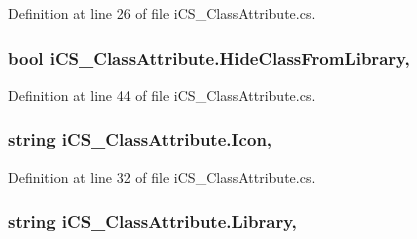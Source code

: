 Definition at line 26 of file i\+C\+S\+\_\+\+Class\+Attribute.\+cs.

\hypertarget{classi_c_s___class_attribute_ae1e20723a8288e0c57b185d021d1f80b}{
\subsubsection[{Hide\+Class\+From\+Library}]{\setlength{\rightskip}{0pt plus 5cm}bool i\+C\+S\+\_\+\+Class\+Attribute.\+Hide\+Class\+From\+Library\hspace{0.3cm}{\ttfamily [get]}, {\ttfamily [set]}}}\label{classi_c_s___class_attribute_ae1e20723a8288e0c57b185d021d1f80b}


Definition at line 44 of file i\+C\+S\+\_\+\+Class\+Attribute.\+cs.

\hypertarget{classi_c_s___class_attribute_aff8b54d19068adfdb7195164014074a5}{
\subsubsection[{Icon}]{\setlength{\rightskip}{0pt plus 5cm}string i\+C\+S\+\_\+\+Class\+Attribute.\+Icon\hspace{0.3cm}{\ttfamily [get]}, {\ttfamily [set]}}}\label{classi_c_s___class_attribute_aff8b54d19068adfdb7195164014074a5}


Definition at line 32 of file i\+C\+S\+\_\+\+Class\+Attribute.\+cs.

\hypertarget{classi_c_s___class_attribute_a776c64441f2fd2fd675db29185dc6000}{
\subsubsection[{Library}]{\setlength{\rightskip}{0pt plus 5cm}string i\+C\+S\+\_\+\+Class\+Attribute.\+Library\hspace{0.3cm}{\ttfamily [get]}, {\ttfamily [set]}}}\label{classi_c_s___class_attribute_a776c64441f2fd2fd675db29185dc6000}


